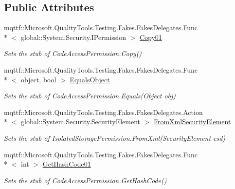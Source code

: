 \subsection*{Public Attributes}
\begin{DoxyCompactItemize}
\item 
mqttf\-::\-Microsoft.\-Quality\-Tools.\-Testing.\-Fakes.\-Fakes\-Delegates.\-Func\\*
$<$ global\-::\-System.\-Security.\-I\-Permission $>$ \hyperlink{class_system_1_1_security_1_1_permissions_1_1_fakes_1_1_stub_isolated_storage_permission_ab030f6a63f7d3065b46739a571743c28}{Copy01}
\begin{DoxyCompactList}\small\item\em Sets the stub of Code\-Access\-Permission.\-Copy()\end{DoxyCompactList}\item 
mqttf\-::\-Microsoft.\-Quality\-Tools.\-Testing.\-Fakes.\-Fakes\-Delegates.\-Func\\*
$<$ object, bool $>$ \hyperlink{class_system_1_1_security_1_1_permissions_1_1_fakes_1_1_stub_isolated_storage_permission_ad3ad850a2c30839d669831f74013b5ec}{Equals\-Object}
\begin{DoxyCompactList}\small\item\em Sets the stub of Code\-Access\-Permission.\-Equals(\-Object obj)\end{DoxyCompactList}\item 
mqttf\-::\-Microsoft.\-Quality\-Tools.\-Testing.\-Fakes.\-Fakes\-Delegates.\-Action\\*
$<$ global\-::\-System.\-Security.\-Security\-Element $>$ \hyperlink{class_system_1_1_security_1_1_permissions_1_1_fakes_1_1_stub_isolated_storage_permission_a8fe3294add15613b09faaec01e7bf852}{From\-Xml\-Security\-Element}
\begin{DoxyCompactList}\small\item\em Sets the stub of Isolated\-Storage\-Permission.\-From\-Xml(\-Security\-Element esd)\end{DoxyCompactList}\item 
mqttf\-::\-Microsoft.\-Quality\-Tools.\-Testing.\-Fakes.\-Fakes\-Delegates.\-Func\\*
$<$ int $>$ \hyperlink{class_system_1_1_security_1_1_permissions_1_1_fakes_1_1_stub_isolated_storage_permission_a99784b6d782a775742430bf3ed2b8e97}{Get\-Hash\-Code01}
\begin{DoxyCompactList}\small\item\em Sets the stub of Code\-Access\-Permission.\-Get\-Hash\-Code()\end{DoxyCompactList}\item 

\end{DoxyCompactItemize}
